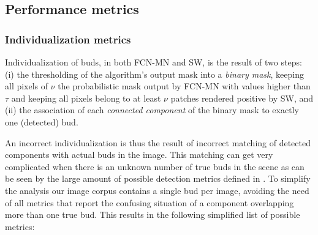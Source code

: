 \documentclass[a4paper,authoryear,review]{elsarticle}
\begin{document}
\subsection{Performance metrics} \label{sec:metrics}





\subsubsection{Individualization metrics } \label{subsec:detectmetrics}

Individualization of buds, in both FCN-MN and SW, is the result of two steps: (i)  the thresholding of the algorithm’s output mask into a \emph{binary mask}, keeping all pixels of $\nu$ the probabilistic mask output by FCN-MN with values higher than $\tau$ and keeping all pixels belong to at least $\nu$ patches rendered positive by SW, and (ii) the association of each \emph{connected component} of the binary mask to exactly one (detected) bud. 

%
An incorrect individualization is thus the result of incorrect matching of detected components with actual buds in the image. This matching can get very complicated when there is an unknown number of true buds in the scene as can be seen by the large amount of possible detection metrics defined in \cite{oguz2017dice}. To simplify the analysis our image corpus contains a single bud per image, avoiding the need of all metrics that report the confusing situation of a component overlapping more than one true bud. This results in the following simplified list of possible metrics:
\end{document}
